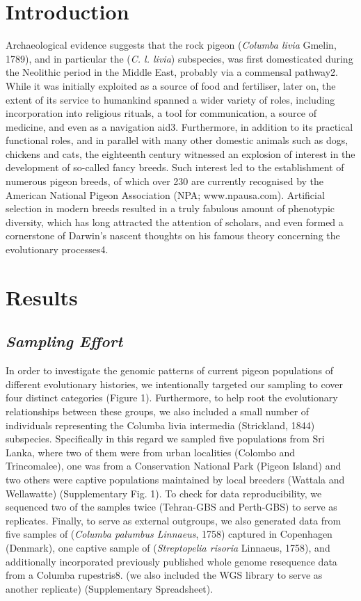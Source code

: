 \documentclass[a4paper]{article}
\begin{document}
\newpage


\section{Introduction}
Archaeological evidence suggests that the rock pigeon (\textit{Columba livia} Gmelin, 1789), and in particular the (\textit{C. l. livia}) subspecies, was first domesticated during the Neolithic period in the Middle East, probably via a commensal pathway2. While it was initially exploited as a source of food and fertiliser, later on, the extent of its service to humankind spanned a wider variety of roles, including incorporation into religious rituals, a tool for communication, a source of medicine, and even as a navigation aid3. Furthermore, in addition to its practical functional roles, and in parallel with many other domestic animals such as dogs, chickens and cats, the eighteenth century witnessed an explosion of interest in the development of so-called fancy breeds. Such interest led to the establishment of numerous pigeon breeds, of which over 230 are currently recognised by the American National Pigeon Association (NPA; www.npausa.com). Artificial selection in modern breeds resulted in a truly fabulous amount of phenotypic diversity, which has long attracted the attention of scholars, and even formed a cornerstone of Darwin’s nascent thoughts on his famous theory concerning the evolutionary processes4.


\section{Results}

\subsection{\textit{Sampling Effort}}

In order to investigate the genomic patterns of current pigeon populations of different evolutionary histories, we intentionally targeted our sampling to cover four distinct categories (Figure 1). Furthermore, to help root the evolutionary relationships between these groups, we also included a small number of individuals representing the Columba livia intermedia (Strickland, 1844) subspecies. Specifically in this regard we sampled five populations from Sri Lanka, where two of them were from urban localities (Colombo and Trincomalee), one was from a Conservation National Park (Pigeon Island) and two others were captive populations maintained by local breeders (Wattala and Wellawatte) (Supplementary Fig. 1). To check for data reproducibility, we sequenced two of the samples twice (Tehran-GBS and Perth-GBS) to serve as replicates. Finally, to serve as external outgroups, we also generated data from five samples of (\textit{Columba palumbus Linnaeus}, 1758) captured in Copenhagen (Denmark), one captive sample of (\textit{Streptopelia risoria} Linnaeus, 1758), and additionally incorporated previously published whole genome resequence data from a Columba rupestris8. (we also included the WGS library to serve as another replicate) (Supplementary Spreadsheet).\
\end{document}
